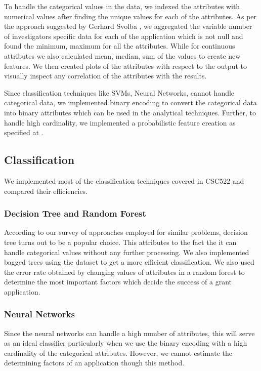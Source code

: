 \documentclass{article} %
\begin{document}
	To handle the categorical values in the data, we indexed the attributes with numerical values after finding the unique values for each of the attributes. As per the approach suggested by Gerhard Svolba \cite{OneRow}, we aggregated the variable number of investigators specific data for each of the application which is not null and found the minimum, maximum for all the attributes. While for continuous attributes we also calculated mean, median, sum of the values to create new features. We then created plots of the attributes with respect to the output to visually inspect any correlation of the attributes with the results.
	
	Since classification techniques like SVMs, Neural Networks, cannot handle categorical data, we implemented binary encoding to convert the categorical data into binary attributes which can be used in the analytical techniques. Further, to handle high cardinality, we implemented a probabilistic feature creation as specified at \cite{HighCard}. 
	
	\subsection{Classification}
	
	We implemented most of the classification techniques covered in CSC522 and compared their efficiencies.
	
	\subsubsection{Decision Tree and Random Forest}
	According to our survey of approaches employed for similar problems, decision tree turns out to be a popular choice. This attributes to the fact the it can handle categorical values without any further processing. We also implemented bagged trees using the dataset to get a more efficient classification. We also used the error rate obtained by changing values of attributes in a random forest to determine the most important factors which decide the success of a grant application.
	
	\subsubsection{Neural Networks}
	Since the neural networks can handle a high number of attributes, this will serve as an ideal classifier particularly when we use the binary encoding with a high cardinality of the categorical attributes. However, we cannot estimate the determining factors of an application though this method.
	
\end{document}
